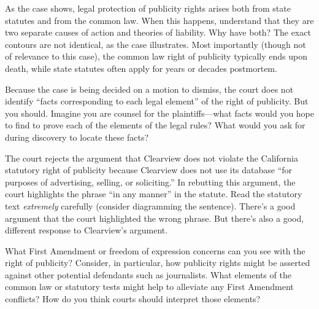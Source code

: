 \item As the case shows, legal protection of publicity rights arises both from
state statutes and from the common law. When this happens, understand that they
are two separate causes of action and theories of liability. Why have both? The
exact contours are not identical, as the case illustrates. Most importantly
(though not of relevance to this case), the common law right of publicity
typically ends upon death, while state statutes often apply for years or decades
postmortem.

\item Because the case is being decided on a motion to dismiss, the court does
not identify ``facts corresponding to each legal element'' of the right of
publicity. But you should. Imagine you are counsel for the plaintiffs---what
facts would you hope to find to prove each of the elements of the legal rules?
What would you ask for during discovery to locate these facts?

\item The court rejects the argument that Clearview does not violate the
California statutory right of publicity because Clearview does not use its
database ``for purposes of advertising, selling, or soliciting.'' In rebutting
this argument, the court highlights the phrase ``in any manner'' in the statute.
Read the statutory text \emph{extremely} carefully (consider diagramming the
sentence). There's a good argument that the court highlighted the wrong phrase.
But there's also a good, different response to Clearview's argument.

\item What First Amendment or
freedom of expression concerns can you see with the right of publicity?
Consider, in particular, how publicity rights might be asserted against other
potential defendants such as journalists. What elements of the common law or
statutory tests might help to alleviate any First Amendment conflicts? How do
you think courts should interpret those elements?


